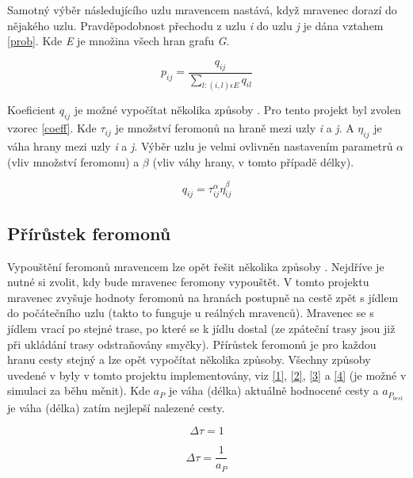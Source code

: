 \documentclass[12pt]{article}
\begin{document}
Samotný výběr následujícího uzlu mravencem nastává, když mravenec dorazí do nějakého uzlu. Pravděpodobnost přechodu z uzlu \textit{i} do uzlu \textit{j} je dána vztahem \ref{prob}. Kde \textit{E} je množina všech hran grafu \textit{G}.

\begin{equation}
\label{prob}
p_{ij} = \frac{q_{ij}}{\sum_{l:(i,l) \epsilon E}  q_{il}}
\end{equation}

Koeficient $ q_{ij} $ je možné vypočítat několika způsoby \cite{glabowski2012shortest}. Pro tento projekt byl zvolen vzorec \ref{coeff}. Kde $ \tau_{ij} $ je množství feromonů na hraně mezi uzly \textit{i} a \textit{j}. A $ \eta_{ij} $ je váha hrany mezi uzly \textit{i} a \textit{j}. Výběr uzlu je velmi ovlivněn nastavením parametrů $ \alpha $ (vliv množství feromonu) a $ \beta $ (vliv váhy hrany, v tomto případě délky).

\begin{equation}
\label{coeff}
q_{ij} = \tau^\alpha_{ij}\eta^\beta_{ij}
\end{equation}

\subsection{Přírůstek feromonů}
\label{inc}
Vypouštění feromonů mravencem lze opět řešit několika způsoby \cite{glabowski2012shortest}. Nejdříve je nutné si zvolit, kdy bude mravenec feromony vypouštět. V tomto projektu mravenec zvyšuje hodnoty feromonů na hranách postupně na cestě zpět s jídlem do počátečního uzlu (takto to funguje u reálných mravenců). Mravenec se s jídlem vrací po stejné trase, po které se k jídlu dostal (ze zpáteční trasy jsou již při ukládání trasy odstraňovány smyčky). Přírůstek feromonů je pro každou hranu cesty stejný a lze opět vypočítat několika způsoby. Všechny způsoby uvedené v \cite{glabowski2012shortest} byly v tomto projektu implementovány, viz \ref{1}, \ref{2}, \ref{3} a \ref{4} (je možné v simulaci za běhu měnit). Kde $ a_P $ je váha (délka) aktuálně hodnocené cesty a $ a_{P_{best}} $ je váha (délka) zatím nejlepší nalezené cesty.

\begin{equation}
\label{1}
\Delta \tau = 1
\end{equation}

\begin{equation}
\label{2}
\Delta \tau = \frac{1}{a_P}
\end{equation}
\end{document}
